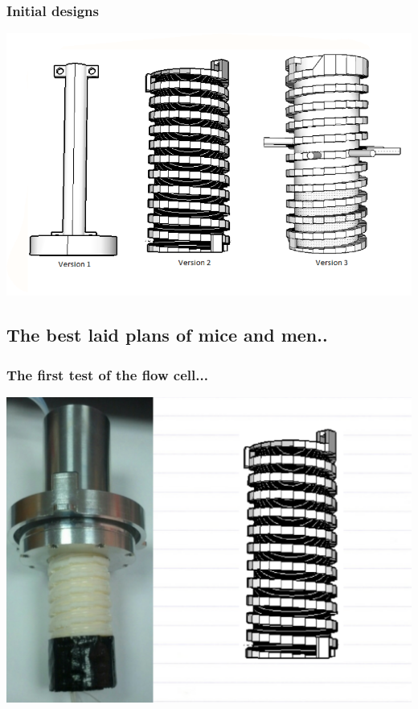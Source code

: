\documentclass[10pt, compress]{beamer}
\begin{document}
\begin{frame}
\frametitle{Initial designs}
\includegraphics[width=\textwidth]{initdesign.PNG}
\end{frame}

\subsection{The best laid plans of mice and men..}

\begin{frame}
\frametitle{The first test of the flow cell...}
\vspace{-1cm}
\begin{center}
\includegraphics[width=\textwidth]{v2insitu.PNG}\end{center}
\end{frame}
\end{document}
